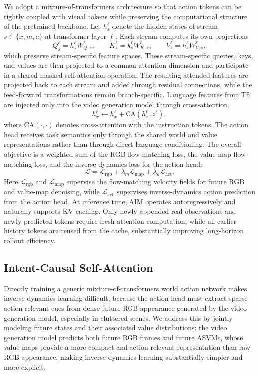 \documentclass{article}
\newcommand{\method}{AIM\xspace}
\newcommand{\mot}{mixture-of-transformers\xspace}
\begin{document}
We adopt a \mot architecture so that action tokens can be tightly coupled with visual tokens while preserving the computational structure of the pretrained backbone. Let $h_s^\ell$ denote the hidden states of stream $s \in \{x,m,a\}$ at transformer layer $\ell$. Each stream computes its own projections
\begin{equation}
Q_s^\ell = h_s^\ell W_{Q,s}^\ell,\qquad
K_s^\ell = h_s^\ell W_{K,s}^\ell,\qquad
V_s^\ell = h_s^\ell W_{V,s}^\ell,
\end{equation}
which preserve stream-specific feature spaces. These stream-specific queries, keys, and values are then projected to a common attention dimension and participate in a shared masked self-attention operation. The resulting attended features are projected back to each stream and added through residual connections, while the feed-forward transformations remain branch-specific. Language features from T5 are injected only into the video generation model through cross-attention,
\begin{equation}
h_x^\ell \leftarrow h_x^\ell + \mathrm{CA}(h_x^\ell, z^{\ell}),
\end{equation}
where $\mathrm{CA}(\cdot,\cdot)$ denotes cross-attention with the instruction tokens. The action head receives task semantics only through the shared world and value representations rather than through direct language conditioning. The overall objective is a weighted sum of the RGB flow-matching loss, the value-map flow-matching loss, and the inverse-dynamics loss for the action head:
\begin{equation}
\mathcal{L} = \mathcal{L}_{\mathrm{rgb}} + \lambda_m \mathcal{L}_{\mathrm{map}} + \lambda_a \mathcal{L}_{\mathrm{act}}.
\end{equation}
Here $\mathcal{L}_{\mathrm{rgb}}$ and $\mathcal{L}_{\mathrm{map}}$ supervise the flow-matching velocity fields for future RGB and value-map denoising, while $\mathcal{L}_{\mathrm{act}}$ supervises inverse-dynamics action prediction from the action head. At inference time, \method operates autoregressively and naturally supports KV caching. Only newly appended real observations and newly predicted tokens require fresh attention computation, while all earlier history tokens are reused from the cache, substantially improving long-horizon rollout efficiency.




\subsection{Intent-Causal Self-Attention}
Directly training a generic \mot world action network makes inverse-dynamics learning difficult, because the action head must extract sparse action-relevant cues from dense future RGB appearance generated by the video generation model, especially in cluttered scenes. We address this by jointly modeling future states and their associated value distributions: the video generation model predicts both future RGB frames and future ASVMs, whose value maps provide a more compact and action-relevant representation than raw RGB appearance, making inverse-dynamics learning substantially simpler and more explicit.
\end{document}

